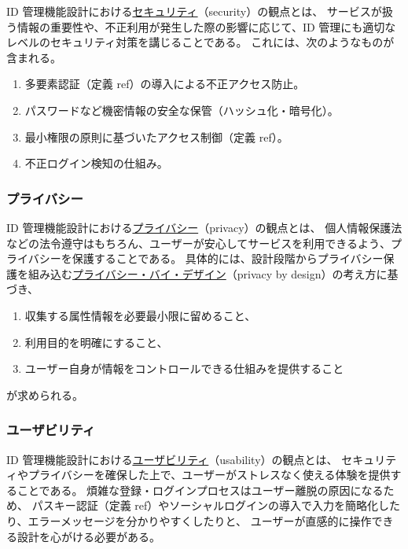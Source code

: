 \documentclass[uplatex]{jsarticle}
\def\ref#1{ref}%
\def\label#1{}%
\begin{document}
\begin{dfn}[セキュリティの観点]\label{dfn:ch5-security}
ID 管理機能設計における\underline{セキュリティ}（security）の観点とは、
サービスが扱う情報の重要性や、不正利用が発生した際の影響に応じて、ID 管理にも適切なレベルのセキュリティ対策を講じることである。
これには、次のようなものが含まれる。
\begin{enumerate}
\item 多要素認証（定義 \ref{dfn:mfa}）の導入による不正アクセス防止。
\item パスワードなど機密情報の安全な保管（ハッシュ化・暗号化）。
\item 最小権限の原則に基づいたアクセス制御（定義 \ref{dfn:access-control}）。
\item 不正ログイン検知の仕組み。
\end{enumerate}
\end{dfn}

\subsubsection{プライバシー}

\begin{dfn}[プライバシーの観点]\label{dfn:ch5-privacy}
ID 管理機能設計における\underline{プライバシー}（privacy）の観点とは、
個人情報保護法などの法令遵守はもちろん、ユーザーが安心してサービスを利用できるよう、プライバシーを保護することである。
具体的には、設計段階からプライバシー保護を組み込む\underline{プライバシー・バイ・デザイン}（privacy by design）の考え方に基づき、
\begin{enumerate}
\item 収集する属性情報を必要最小限に留めること、
\item 利用目的を明確にすること、
\item ユーザー自身が情報をコントロールできる仕組みを提供すること
\end{enumerate}
が求められる。
\end{dfn}

\subsubsection{ユーザビリティ}

\begin{dfn}[ユーザビリティの観点]\label{dfn:ch5-usability}
ID 管理機能設計における\underline{ユーザビリティ}（usability）の観点とは、
セキュリティやプライバシーを確保した上で、ユーザーがストレスなく使える体験を提供することである。
煩雑な登録・ログインプロセスはユーザー離脱の原因になるため、
パスキー認証（定義 \ref{dfn:passkey}）やソーシャルログインの導入で入力を簡略化したり、エラーメッセージを分かりやすくしたりと、
ユーザーが直感的に操作できる設計を心がける必要がある。
\end{dfn}
\end{document}
